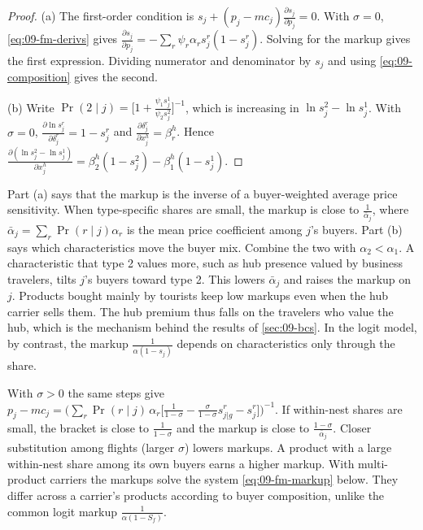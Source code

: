 \begin{proof}
(a) The first-order condition is $s_j+(p_j-mc_j)\frac{\partial s_j}{\partial p_j}=0$. With $\sigma=0$,
\eqref{eq:09-fm-derivs} gives $\frac{\partial s_j}{\partial p_j}=-\sum_r\psi_r\alpha_rs^r_j(1-s^r_j)$.
Solving for the markup gives the first expression. Dividing numerator and denominator by $s_j$ and using
\eqref{eq:09-composition} gives the second.

(b) Write $\Pr(2\mid j)=\Big[1+\frac{\psi_1s^1_j}{\psi_2s^2_j}\Big]^{-1}$, which is increasing in
$\ln s^2_j-\ln s^1_j$. With $\sigma=0$, $\frac{\partial\ln s^r_j}{\partial\delta^r_j}=1-s^r_j$ and
$\frac{\partial\delta^r_j}{\partial x^h_j}=\beta^h_r$. Hence
$\frac{\partial(\ln s^2_j-\ln s^1_j)}{\partial x^h_j}=\beta^h_2(1-s^2_j)-\beta^h_1(1-s^1_j)$.
\end{proof}

Part (a) says that the markup is the inverse of a buyer-weighted average price sensitivity. When
type-specific shares are small, the markup is close to $\frac{1}{\bar\alpha_j}$, where
$\bar\alpha_j=\sum_r\Pr(r\mid j)\alpha_r$ is the mean price coefficient among $j$'s buyers. Part (b) says
which characteristics move the buyer mix. Combine the two with $\alpha_2<\alpha_1$. A characteristic that
type 2 values more, such as hub presence valued by business travelers, tilts $j$'s buyers toward type 2.
This lowers $\bar\alpha_j$ and raises the markup on $j$. Products bought mainly by tourists keep low
markups even when the hub carrier sells them. The hub premium thus falls on the travelers who value the
hub, which is the mechanism behind the results of \cref{sec:09-bcs}. In the logit model, by contrast,
the markup $\frac{1}{\alpha(1-s_j)}$ depends on characteristics only through the share.

\begin{remark}\label{rem:09-fm-extensions}
With $\sigma>0$ the same steps give
$p_j-mc_j=\Big(\sum_r\Pr(r\mid j)\,\alpha_r\Big[\frac{1}{1-\sigma}-\frac{\sigma}{1-\sigma}s^r_{j|g}-s^r_j\Big]\Big)^{-1}$.
If within-nest shares are small, the bracket is close to $\frac{1}{1-\sigma}$ and the markup is close to
$\frac{1-\sigma}{\bar\alpha_j}$. Closer substitution among flights (larger $\sigma$) lowers markups. A
product with a large within-nest share among its own buyers earns a higher markup. With multi-product
carriers the markups solve the system \eqref{eq:09-fm-markup} below. They differ across a carrier's
products according to buyer composition, unlike the common logit markup $\frac{1}{\alpha(1-S_f)}$.
\end{remark}

